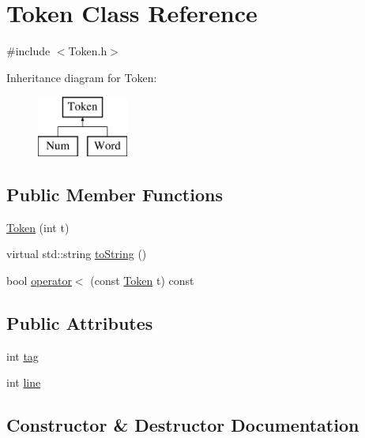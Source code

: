 \hypertarget{class_token}{}\section{Token Class Reference}
\label{class_token}


{\ttfamily \#include $<$Token.\+h$>$}

Inheritance diagram for Token\+:\begin{figure}[H]
\begin{center}
\leavevmode
\includegraphics[height=2.000000cm]{class_token}
\end{center}
\end{figure}
\subsection*{Public Member Functions}
\begin{DoxyCompactItemize}
\item 
\hyperlink{class_token_a29580f176bfba9981aeec62946114675}{Token} (int t)
\item 
virtual std\+::string \hyperlink{class_token_a8863381edabce7bc1e92473b445ba81f}{to\+String} ()
\item 
bool \hyperlink{class_token_a745ea87ba20ab7e4d3f9061c62c179ca}{operator$<$} (const \hyperlink{class_token}{Token} t) const
\end{DoxyCompactItemize}
\subsection*{Public Attributes}
\begin{DoxyCompactItemize}
\item 
int \hyperlink{class_token_a2a4b0e1b648c2a9be1976004eb3c4ff0}{tag}
\item 
int \hyperlink{class_token_a4b96c2a31d7c374fd2bd1986794f80dd}{line}
\end{DoxyCompactItemize}


\subsection{Constructor \& Destructor Documentation}
\mbox{\label{class_token_a29580f176bfba9981aeec62946114675}} 
